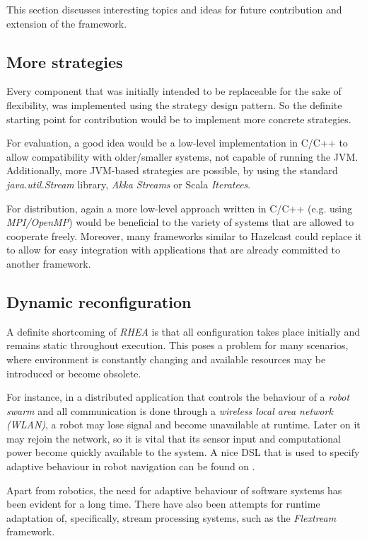\documentclass[sigplan,review,anonymous]{acmart}\settopmatter{printfolios=true}
\begin{document}
This section discusses interesting topics and ideas for future contribution and extension of the framework.

\subsection{More strategies}

Every component that was initially intended to be replaceable for the sake of flexibility, was implemented using the strategy design pattern. So the definite starting point for contribution would be to implement more concrete strategies.

For evaluation, a good idea would be a low-level implementation in C/C++ to allow compatibility with older/smaller systems, not capable of running the JVM. Additionally, more JVM-based strategies are possible, by using the standard \textit{java.util.Stream} library, \textit{Akka Streams} or Scala \textit{Iteratees}\cite{iteratees}.

For distribution, again a more low-level approach written in C/C++ (e.g. using \textit{MPI/OpenMP}) would be beneficial to the variety of systems that are allowed to cooperate freely. Moreover, many frameworks similar to Hazelcast could replace it to allow for easy integration with applications that are already committed to another framework.

\subsection{Dynamic reconfiguration}

A definite shortcoming of \textit{RHEA} is that all configuration takes place initially and remains static throughout execution. This poses a problem for many scenarios, where environment is constantly changing and available resources may be introduced or become obsolete. 

For instance, in a distributed application that controls the behaviour of a \textit{robot swarm} and all communication is done through a \textit{wireless local area network (WLAN)}, a robot may lose signal and become unavailable at runtime. Later on it may rejoin the network, so it is vital that its sensor input and computational power become quickly available to the system. A nice DSL that is used to specify adaptive behaviour in robot navigation can be found on \cite{reconf_robot}.

Apart from robotics, the need for adaptive behaviour of software systems has been evident for a long time\cite{reconf_survey}. There have also been attempts for runtime adaptation of, specifically, stream processing systems, such as the \textit{Flextream} framework\cite{flextream}. 
\end{document}
